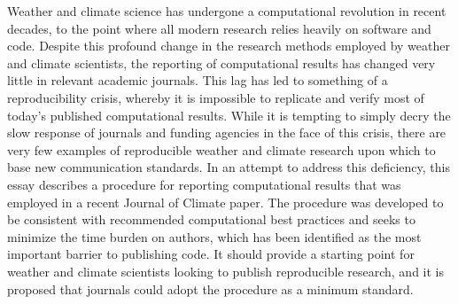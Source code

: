 Weather and climate science has undergone a computational revolution in recent decades, to the point where all modern research relies heavily on software and code. Despite this profound change in the research methods employed by weather and climate scientists, the reporting of computational results has changed very little in relevant academic journals. This lag has led to something of a reproducibility crisis, whereby it is impossible to replicate and verify most of today’s published computational results. While it is tempting to simply decry the slow response of journals and funding agencies in the face of this crisis, there are very few examples of reproducible weather and climate research upon which to base new communication standards. In an attempt to address this deficiency, this essay describes a procedure for reporting computational results that was employed in a recent Journal of Climate paper. The procedure was developed to be consistent with recommended computational best practices and seeks to minimize the time burden on authors, which has been identified as the most important barrier to publishing code. It should provide a starting point for weather and climate scientists looking to publish reproducible research, and it is proposed that journals could adopt the procedure as a minimum standard.